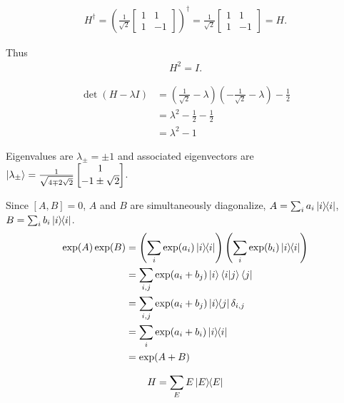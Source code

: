 
\begin{align*}
	H^\dagger = \left(\frac{1}{\sqrt{2}} \begin{bmatrix}
	1 & 1 \\
	1 & -1
	\end{bmatrix}\right)^\dagger
	=
	\frac{1}{\sqrt{2}} \begin{bmatrix}
	1 & 1 \\
	1 & -1
	\end{bmatrix}
	=
	H.
\end{align*}

Thus
\begin{align*}
	H^2 = I.
\end{align*}




\begin{align*}
	\det \left(H - \lambda I\right) &= \left(\frac{1}{\sqrt{2}} - \lambda \right) \left(- \frac{1}{\sqrt{2}} - \lambda \right) - \frac{1}{2}\\
		&= \lambda^2 - \frac{1}{2} - \frac{1}{2}\\
		&= \lambda^2 - 1
\end{align*}

Eigenvalues are $\lambda_\pm = \pm 1$ and associated eigenvectors are $\ket{\lambda_\pm} = \frac{1}{\sqrt{4 \mp 2 \sqrt{2}}} \begin{bmatrix}
1 \\
-1 \pm \sqrt{2}
\end{bmatrix} $.





Since $[A, B] = 0$, $A$ and $B$ are simultaneously diagonalize, $A = \sum_i a_i \ket{i}\hspace{-1mm} \bra{i}$, $B = \sum_i b_i \ket{i}\hspace{-1mm} \bra{i}$.
\begin{align*}
	\exp (A) \exp (B) &= \left(\sum_i \exp (a_i) \ket{i}\hspace{-1mm} \bra{i}\right) \left(\sum_i \exp (b_i) \ket{i}\hspace{-1mm} \bra{i}\right) \\
		&= \sum_{i,j} \exp (a_i + b_j) \ket{i} \braket{i | j} \bra{j}\\
		&= \sum_{i,j} \exp (a_i + b_j) \ket{i}\hspace{-1mm} \bra{j} \delta_{i, j}\\
		&= \sum_i \exp (a_i +  b_i) \ket{i}\hspace{-1mm} \bra{i}\\
		&= \exp (A+B)
\end{align*}


\begin{align*}
	H = \sum_E E \ket{E}\hspace{-1mm} \bra{E}
\end{align*}

